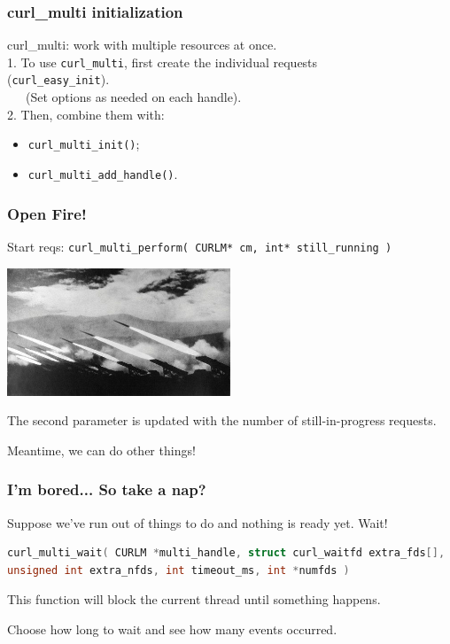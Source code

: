 \begin{frame}
  \frametitle{curl\_multi initialization}

  
    curl\_multi: work with multiple resources at once.\\[1em]
    
    1. To use {\tt curl\_multi}, first create the individual requests \\ \hspace{2em} ({\tt curl\_easy\_init}).\\
    ~~~(Set options as needed on each handle).\\[1em]

    2. Then, combine them with:
    \begin{itemize}
      \item {\tt curl\_multi\_init()};
      \item {\tt curl\_multi\_add\_handle()}.
    \end{itemize}

  

\end{frame}


\begin{frame}
\frametitle{Open Fire!}

Start reqs: \texttt{curl\_multi\_perform( CURLM* cm, int* still\_running )}

\begin{center}
\includegraphics[width=0.5\textwidth]{images/artillery.jpeg}
\end{center}

The second parameter is updated with the number of still-in-progress requests.

Meantime, we can do other things!

\end{frame}


\begin{frame}[fragile]
\frametitle{I'm bored... So take a nap?}

Suppose we've run out of things to do and nothing is ready yet. Wait!

\begin{lstlisting}[language=C]
curl_multi_wait( CURLM *multi_handle, struct curl_waitfd extra_fds[], 
unsigned int extra_nfds, int timeout_ms, int *numfds )
\end{lstlisting}

This function will block the current thread until something happens.

Choose how long to wait and see how many events occurred.

\end{frame}


